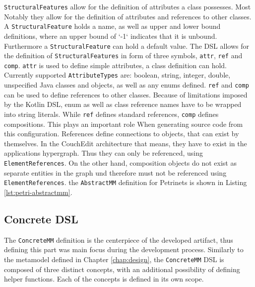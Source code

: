 
% 


% 

\texttt{StructuralFeatures} allow for the definition of attributes a class possesses. Most Notably they allow for the definition of attributes and references to other classes. A \texttt{StructuralFeature} holds a name, as well as upper and lower bound definitions, where an upper bound of `-1` indicates that it is unbound. Furthermore a \texttt{StructuralFeature} can hold a default value. The DSL allows for the definition of \texttt{StructuralFeatures} in form of three symbols, \texttt{attr}, \texttt{ref} and \texttt{comp}. \texttt{attr} is used to define simple attributes, a class definition can hold. Currently supported \texttt{AttributeTypes} are: boolean, string, integer, double, unspecified Java classes and objects, as well as any enums defined. \texttt{ref} and \texttt{comp} can be used to define references to other classes. Because of limitations imposed by the Kotlin DSL, enum as well as class reference names have to be wrapped into string literals. While \texttt{ref} defines standard references, \texttt{comp} defines compositions. This plays an important role When generating source code from this configuration. References define connections to objects, that can exist by themselves. In the CouchEdit architecture that means, they have to exist in the applications hypergraph. Thus they can only be referenced, using \texttt{ElementReferences}. On the other hand, composition objects do not exist as separate entities in the graph und therefore must not be referenced using \texttt{ElementReferences}. the \texttt{AbstractMM} definition for Petrinets is shown in Listing \ref{lst:petri-abstractmm}.

\subsection{Concrete DSL}
The \texttt{ConcreteMM} definition is the centerpiece of the developed artifact, thus defining this part was main focus during the development process. Similarly to the metamodel defined in Chapter \ref{chap:design}, the \texttt{ConcreteMM} DSL is composed of three distinct concepts, with an additional possibility of defining helper functions. Each of the concepts is defined in its own scope.


